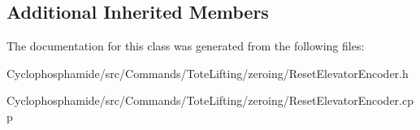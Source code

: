 \subsection*{Additional Inherited Members}


The documentation for this class was generated from the following files\+:\begin{DoxyCompactItemize}
\item 
Cyclophosphamide/src/\+Commands/\+Tote\+Lifting/zeroing/Reset\+Elevator\+Encoder.\+h\item 
Cyclophosphamide/src/\+Commands/\+Tote\+Lifting/zeroing/Reset\+Elevator\+Encoder.\+cpp\end{DoxyCompactItemize}
